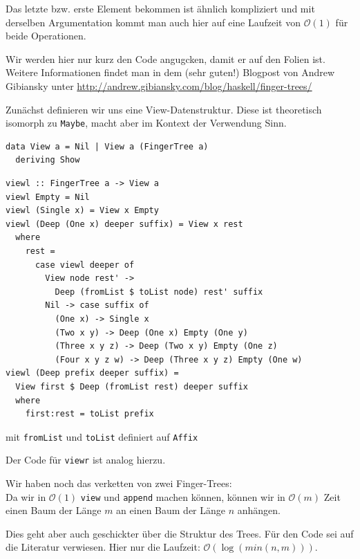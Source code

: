 \documentclass{beamer}
\begin{document}
\begin{frame}
Das letzte bzw. erste Element bekommen ist ähnlich kompliziert und mit derselben Argumentation kommt man auch hier auf eine Laufzeit von $\mathcal{O}(1)$ für beide Operationen.\pause\bigskip

Wir werden hier nur kurz den Code angugcken, damit er auf den Folien ist. Weitere Informationen findet man in dem (sehr guten!) Blogpost von Andrew Gibiansky unter \url{http://andrew.gibiansky.com/blog/haskell/finger-trees/}
\end{frame}

\begin{frame}[fragile]
Zunächst definieren wir uns eine View-Datenstruktur. Diese ist theoretisch isomorph zu \texttt{Maybe}, macht aber im Kontext der Verwendung Sinn. \bigskip

\begin{verbatim}
data View a = Nil | View a (FingerTree a)
  deriving Show
\end{verbatim}
\end{frame}

\begin{frame}[fragile]
\begin{verbatim}
viewl :: FingerTree a -> View a
viewl Empty = Nil              
viewl (Single x) = View x Empty
viewl (Deep (One x) deeper suffix) = View x rest
  where
    rest =
      case viewl deeper of
        View node rest' ->
          Deep (fromList $ toList node) rest' suffix
        Nil -> case suffix of
          (One x) -> Single x
          (Two x y) -> Deep (One x) Empty (One y)
          (Three x y z) -> Deep (Two x y) Empty (One z)
          (Four x y z w) -> Deep (Three x y z) Empty (One w)
viewl (Deep prefix deeper suffix) =
  View first $ Deep (fromList rest) deeper suffix
  where
    first:rest = toList prefix
\end{verbatim}
mit \texttt{fromList} und \texttt{toList} definiert auf \texttt{Affix}
\end{frame}

\begin{frame}
Der Code für \texttt{viewr} ist analog hierzu.\\\par\pause
Wir haben noch das verketten von zwei Finger-Trees:\\
Da wir in $\mathcal{O}(1)$ \texttt{view} und \texttt{append} machen können, können wir in $\mathcal{O}(m)$ Zeit einen Baum der Länge $m$ an einen Baum der Länge $n$ anhängen.\pause
\bigskip

Dies geht aber auch geschickter über die Struktur des Trees. Für den Code sei auf die Literatur verwiesen. Hier nur die Laufzeit: $\mathcal{O}(\log (min(n,m)))$.
\end{frame}
\end{document}

